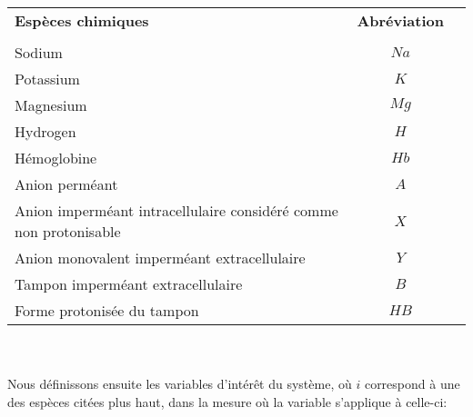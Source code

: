 \documentclass[a4paper,fleqn]{article}
\begin{document}
\begin{tabular}{p{11cm}cr}
\textbf{Espèces chimiques}                                                   & \textbf{Abréviation} \\
\\
Sodium                                                            & ${Na}$   \\
Potassium                                                         & $K$    \\
Magnesium                                                         & ${Mg}$   \\
Hydrogen                                                          & $H$    \\
Hémoglobine                                                       & ${Hb}$   \\
Anion perméant                                                    & $A$    \\
Anion imperméant intracellulaire considéré comme non protonisable & $X$    \\
Anion monovalent imperméant extracellulaire                       & $Y$    \\
Tampon imperméant extracellulaire                                 & $B$    \\
Forme protonisée du tampon                                        & ${HB}$   \\

\end{tabular}\\
\\


Nous définissons ensuite les variables d'intérêt du système, où $i$ correspond à une des espèces citées plus haut, dans la mesure où la variable s'applique à celle-ci: \\
\\
\end{document}
